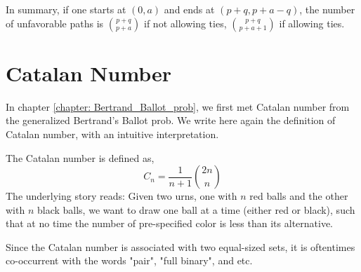 In summary, if one starts at $(0,a)$ and ends at $(p+q,p+a-q)$, the number of unfavorable paths is $p+q \choose p+a$ if not allowing ties, $p+q \choose p+a+1$ if allowing ties.


\section{Catalan Number}
In chapter \ref{chapter: Bertrand_Ballot_prob}, we first met Catalan number from the generalized Bertrand's Ballot prob. We write here again the definition of Catalan number, with an intuitive interpretation.

The Catalan number is defined as,
\begin{equation}
	C_n = \frac{1}{n+1} {2n \choose n}
\end{equation}
The underlying story reads: Given two urns, one with $n$ red balls and the other with $n$ black balls, we want to draw one ball at a time (either red or black), such that at no time the number of pre-specified color is less than its alternative.

Since the Catalan number is associated with two equal-sized sets, it is oftentimes co-occurrent  with the words "pair", "full binary", and etc.